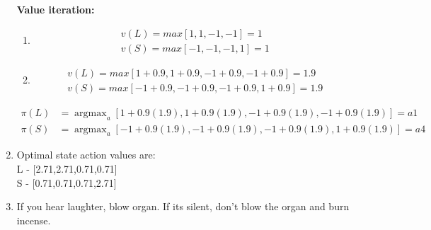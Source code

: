 \documentclass[12pt]{extarticle}
\DeclareMathOperator*{\argmax}{argmax} %
\begin{document}
\begin{enumerate}[label=(\alph*)]
\textbf{Value iteration:}\\
	\begin{enumerate}[label=\arabic*)]
	\item
	\begin{align*}
	v(L) = max[1,1,-1,-1] = 1 \\
	v(S) = max[-1,-1,-1,1] = 1
	\end{align*}
	\item
	\begin{align*}
	v(L) = max[1+0.9,1+0.9,-1+0.9,-1+0.9] = 1.9 \\
	v(S) = max[-1+0.9,-1+0.9,-1+0.9,1+0.9] = 1.9
	\end{align*}
	\end{enumerate}
	\begin{align*}
	\pi(L) & = \argmax_a[{1+0.9(1.9),1+0.9(1.9),-1+0.9(1.9),-1+0.9(1.9)}] = a1 \\
	\pi(S) & = \argmax_a[{-1+0.9(1.9),-1+0.9(1.9),-1+0.9(1.9),1+0.9(1.9)}] = a4
	\end{align*}
	
\item Optimal state action values are:\\
L - [2.71,2.71,0.71,0.71]\\
S - [0.71,0.71,0.71,2.71]

\item If you hear laughter, blow organ. If its silent, don't blow the organ and burn incense.
\end{enumerate}
\end{document}

